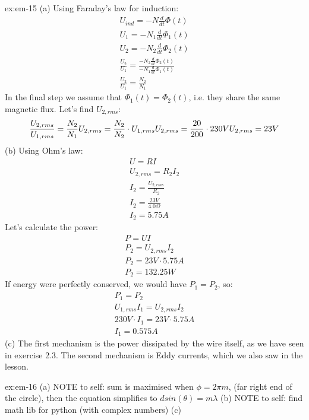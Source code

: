\begin{solution}{ex:em-15}
  (a) Using Faraday's law for induction:
  \[
    \begin{gathered}
      U_{ind}=-N \frac{d}{dt}\Phi (t)\\
      U_1 = -N_1 \frac{d}{dt} \Phi_1 (t)\\
      U_2= -N_2 \frac{d}{dt} \Phi_2 (t)\\
      \frac{U_2}{U_1} = \frac{-N_2 \frac{d}{dt} \Phi_2 (t)}{-N_1 \frac{d}{dt} \Phi_1 (t)}\\
      \frac{U_2}{U_1} = \frac{N_2}{N_1}
    \end{gathered}
  \]
  In the final step we assume that $\Phi_1 (t) = \Phi_2 (t)$, i.e. they share the same magnetic flux.
  Let's find $U_{2,rms}$:
  \[
    \frac{U_{2,rms}}{U_{1,rms}}=\frac{N_2}{N_1}\\
    U_{2,rms}=\frac{N_2}{N_2}\cdot U_{1,rms}\\
    U_{2,rms}=\frac{20}{200} \cdot 230V\\
    U_{2,rms}=23V
  \]
  (b) Using Ohm's law:
  \[
    \begin{gathered}
      U=RI\\
      U_{2,rms}=R_2 I_2\\
      I_2 = \frac{U_{2,rms}}{R_2}\\
      I_2 = \frac{23V}{4.0\Omega}\\
      I_2 = 5.75 A
    \end{gathered}
  \]
  Let's calculate the power:
  \[
    \begin{gathered}
      P=UI\\
      P_2=U_{2,rms}I_2\\
      P_2=23V \cdot 5.75A\\
      P_2=132.25 W
    \end{gathered}
  \]
  If energy were perfectly conserved, we would have $P_1=P_2$, so:
  \[
    \begin{gathered}
      P_1=P_2\\
      U_{1,rms}I_1=U_{2,rms}I_2\\
      230V \cdot I_1 = 23V \cdot 5.75 A \\
      I_1=0.575A
    \end{gathered}
  \]
  (c)
  The first mechanism is the power dissipated by the wire itself, as we have seen in exercise 2.3. The second mechanism is Eddy currents, which we also saw in the lesson.
\end{solution}
\begin{solution}{ex:em-16}
  (a)
  NOTE to self: sum is maximised when $\phi = 2\pi m$, (far right end of the circle), then the equation simplifies to $dsin(\theta) = m\lambda$ 
  (b) NOTE to self: find math lib for python (with complex numbers)
  (c) 

\end{solution}
